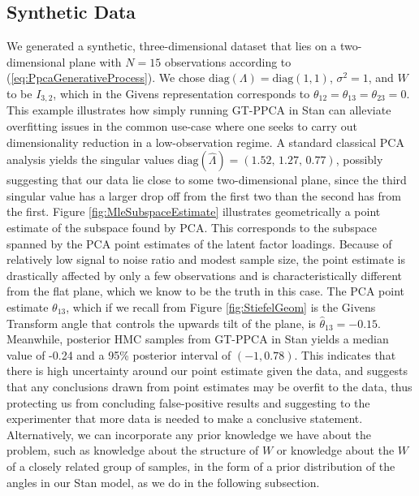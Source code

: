\documentclass{article}
\begin{document}
\subsection{Synthetic Data}
We generated a synthetic, three-dimensional dataset that lies on a two-dimensional plane with $N =15$ observations according to (\ref{eq:PpcaGenerativeProcess}). We chose $\mathrm{diag}(\Lambda) =\mathrm{diag}(1, 1)$, $\sigma^2 = 1$, and $W$ to be $I_{3,2}$, which in the Givens representation corresponds to $\theta_{12} = \theta_{13} = \theta_{23} = 0$. This example illustrates how simply running GT-PPCA in Stan can alleviate overfitting issues in the common use-case where one seeks to carry out dimensionality reduction in a low-observation regime. A standard classical PCA analysis yields the singular values $\mathrm{diag}(\hat{\Lambda}) = (1.52,\, 1.27,\, 0.77)$,  possibly suggesting that our data lie close to some two-dimensional plane, since the third singular value has a larger drop off from the first two than the second has from the first. Figure \ref{fig:MleSubspaceEstimate} illustrates geometrically a point estimate of the subspace found by PCA. This corresponds to the subspace spanned by the PCA point estimates of the latent factor loadings. Because of relatively low signal to noise ratio and modest sample size, the point estimate is drastically affected by only a few observations and is characteristically different from the flat plane, which we know to be the truth in this case. The PCA point estimate $\theta_{13}$, which if we recall from Figure \ref{fig:StiefelGeom} is the Givens Transform angle that controls the upwards tilt of the plane, is $\hat{\theta}_{13} = -0.15$. Meanwhile, posterior HMC samples from GT-PPCA in Stan yields a median value of -0.24 and a 95\% posterior interval of $(-1, 0.78)$. This indicates that there is high uncertainty around our point estimate given the data, and suggests that any conclusions drawn from point estimates may be overfit to the data, thus protecting us from concluding false-positive results and suggesting to the experimenter that more data is needed to make a conclusive statement. Alternatively, we can incorporate any prior knowledge we have about the problem, such as knowledge about the structure of $W$ or knowledge about the $W$ of a closely related group of samples, in the form of a prior distribution of the angles in our Stan model, as we do in the following subsection.
\end{document}
